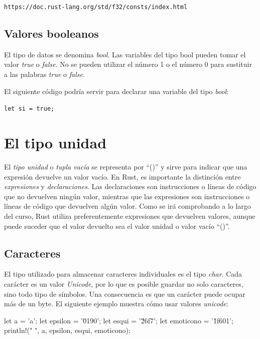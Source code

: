 {\centering \texttt{https://doc.rust-lang.org/std/f32/consts/index.html} \par}   

\subsection{Valores booleanos}
\noindent El tipo de datos se denomina \textit{bool}. Las variables del tipo bool pueden tomar el valor \textit{true} o \textit{false}. No se pueden utilizar el número 1 o el número 0 para sustituir a las palabras \textit{true} o \textit{false}.

El siguiente código podría servir para declarar una variable del tipo \textit{bool}:

{\centering \texttt{let si = true;} \par}   

\section{El tipo unidad}
\noindent El \textit{tipo unidad} o \textit{tupla vacía} se representa por ``()'' y sirve para indicar que una expresión devuelve un valor vacío. En Rust, es importante la distinción entre \textit{expresiones} y \textit{declaraciones}. Las declaraciones son instrucciones o líneas de código que no devuelven ningún valor, mientras que las expresiones son instrucciones o líneas de código que devuelven algún valor. Como se irá comprobando a lo largo del curso, Rust utiliza preferentemente expresiones que devuelven valores, aunque puede suceder que el valor devuelto sea el valor unidad o valor vacío ``()''.

\subsection{Caracteres}
\noindent El tipo utilizado para almacenar caracteres individuales es el tipo \textit{char}. Cada carácter es un valor \textit{Unicode}, por lo que es posible guardar no solo caracteres, sino todo tipo de símbolos. Una consecuencia es que un carácter puede ocupar más de un byte. El siguiente ejemplo muestra cómo usar valores \textit{unicode}:

\vspace{0.7em}
\begin{Codigo}
let a = 'a';
let epsilon = '\u{0190}';
let esqui = '\u{26f7}';
let emoticono = '\u{1f601}';
println!("{} {} {} {}", a, epsilon, esqui, emoticono);
\end{Codigo} 

